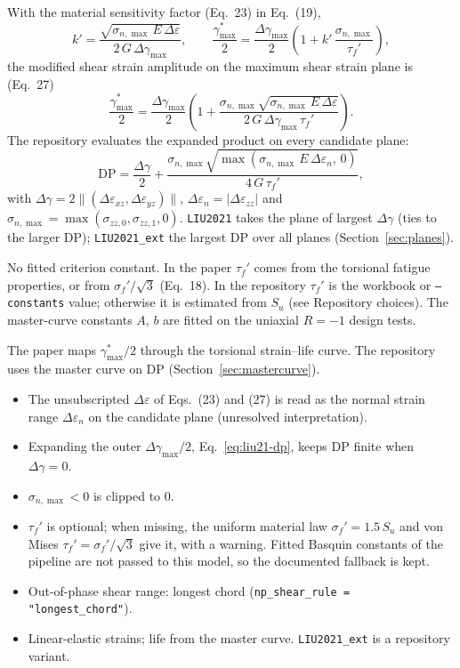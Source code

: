  With the material sensitivity factor (Eq.~23) in Eq.~(19),
\begin{equation}
k'=\frac{\sqrt{\sigma_{n,\max}\,E\,\Delta\varepsilon}}{2\,G\,\Delta\gamma_{\max}},\qquad
\frac{\gamma^*_{\max}}{2}=\frac{\Delta\gamma_{\max}}{2}\left(1+k'\,\frac{\sigma_{n,\max}}{\tau_f'}\right),
\label{eq:liu21-k}
\end{equation}
the modified shear strain amplitude on the maximum shear strain plane is (Eq.~27)
\begin{equation}
\frac{\gamma^*_{\max}}{2}=\frac{\Delta\gamma_{\max}}{2}
\left(1+\frac{\sigma_{n,\max}\sqrt{\sigma_{n,\max}\,E\,\Delta\varepsilon}}{2\,G\,\Delta\gamma_{\max}\,\tau_f'}\right).
\label{eq:liu21-main}
\end{equation}
The repository evaluates the expanded product on every candidate plane:
\begin{equation}
\mathrm{DP}=\frac{\Delta\gamma}{2}+\frac{\sigma_{n,\max}\sqrt{\max(\sigma_{n,\max}\,E\,\Delta\varepsilon_n,\,0)}}{4\,G\,\tau_f'},
\label{eq:liu21-dp}
\end{equation}
with $\Delta\gamma=2\lVert(\Delta\varepsilon_{xz},\Delta\varepsilon_{yz})\rVert$,
$\Delta\varepsilon_n=\lvert\Delta\varepsilon_{zz}\rvert$ and
$\sigma_{n,\max}=\max(\sigma_{zz,0},\sigma_{zz,1},0)$. \texttt{LIU2021} takes the plane of largest
$\Delta\gamma$ (ties to the larger DP); \texttt{LIU2021\_ext} the largest DP over all planes
(Section~\ref{sec:planes}).

 No fitted criterion constant. In the paper $\tau_f'$ comes from
the torsional fatigue properties, or from $\sigma_f'/\sqrt3$ (Eq.~18). In the repository $\tau_f'$
is the workbook or \texttt{--constants} value; otherwise it is estimated from $S_u$ (see Repository
choices). The master-curve constants $A$, $b$ are fitted on the uniaxial $R=-1$ design tests.

 The paper maps $\gamma^*_{\max}/2$ through the torsional strain--life curve. The
repository uses the master curve on DP (Section~\ref{sec:mastercurve}).

\begin{itemize}
\item The unsubscripted $\Delta\varepsilon$ of Eqs.~(23) and (27) is read as the normal strain range
  $\Delta\varepsilon_n$ on the candidate plane (unresolved interpretation).
\item Expanding the outer $\Delta\gamma_{\max}/2$, Eq.~\eqref{eq:liu21-dp}, keeps DP finite when
  $\Delta\gamma=0$.
\item $\sigma_{n,\max}<0$ is clipped to 0.
\item $\tau_f'$ is optional; when missing, the uniform material law $\sigma_f'=1.5\,S_u$ and von
  Mises $\tau_f'=\sigma_f'/\sqrt3$ give it, with a warning. Fitted Basquin constants of the
  pipeline are not passed to this model, so the documented fallback is kept.
\item Out-of-phase shear range: longest chord (\texttt{np\_shear\_rule = "longest\_chord"}).
\item Linear-elastic strains; life from the master curve. \texttt{LIU2021\_ext} is a repository
  variant.
\end{itemize}

